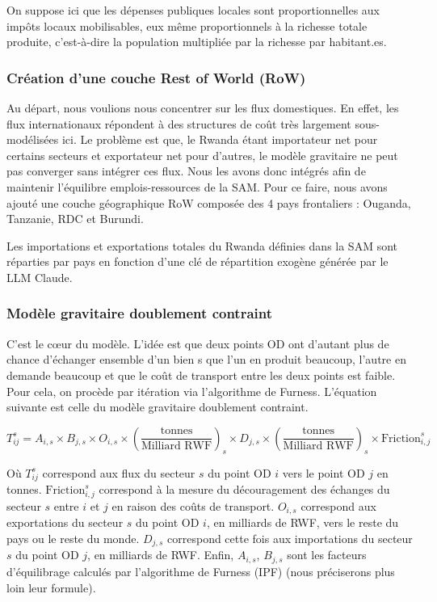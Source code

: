 \documentclass[12pt,a4paper,french]{report}
\begin{document}
	On suppose ici que les dépenses publiques locales sont proportionnelles aux impôts locaux mobilisables, eux même proportionnels à la richesse totale produite, c'est-à-dire la population multipliée par la richesse par habitant.es.

	
	\subsubsection{Création d'une couche Rest of World (RoW)}
	\label{subsubsec:RoW}
	
	Au départ, nous voulions nous concentrer sur les flux domestiques. En effet, les flux internationaux répondent à des structures de coût très largement sous-modélisées ici. Le problème est que, le Rwanda étant importateur net pour certains secteurs et exportateur net pour d'autres, le modèle gravitaire ne peut pas converger sans intégrer ces flux. Nous les avons donc intégrés afin de maintenir l'équilibre emplois-ressources de la SAM. Pour ce faire, nous avons ajouté une couche géographique RoW composée des 4 pays frontaliers : Ouganda, Tanzanie, RDC et Burundi.
	
	Les importations et exportations totales du Rwanda définies dans la SAM sont réparties par pays en fonction d'une clé de répartition exogène générée par le LLM Claude. 
	
	\subsubsection{Modèle gravitaire doublement contraint}
	\label{subsubsec:gravitaire}
	
	C'est le c\oe ur du modèle. L'idée est que deux points OD ont d'autant plus de chance d'échanger ensemble d'un bien s que l'un en produit beaucoup, l'autre en demande beaucoup et que le coût de transport entre les deux points est faible. Pour cela, on procède par itération via l'algorithme de Furness. L'équation suivante est celle du modèle gravitaire doublement contraint.
	
	\begin{equation}
		T_{ij}^s = A_{i,s} \times B_{j,s} \times O_{i,s} \times  \left( \frac{\text{tonnes}}{\text{Milliard RWF}} \right)_s \times D_{j,s}  \times \left( \frac{\text{tonnes}}{\text{Milliard RWF}} \right)_s \times \text{Friction}_{i,j}^s
		\label{eq:gravitaire}
	\end{equation}
	
	Où $T_{ij}^s$ correspond aux flux du secteur $s$ du point OD $i$ vers le point OD $j$ en tonnes. $\text{Friction}_{i,j}^s$ correspond à la mesure du découragement des échanges du secteur $s$ entre $i$ et $j$ en raison des coûts de transport. $O_{i,s}$ correspond aux exportations du secteur $s$ du point OD $i$, en milliards de RWF, vers le reste du pays ou le reste du monde. $D_{j,s}$ correspond cette fois aux importations du secteur $s$ du point OD $j$, en milliards de RWF. Enfin, $A_{i,s}$, $B_{j,s}$ sont les facteurs d'équilibrage calculés par l'algorithme de Furness (IPF) (nous préciserons plus loin leur formule).
\end{document}
